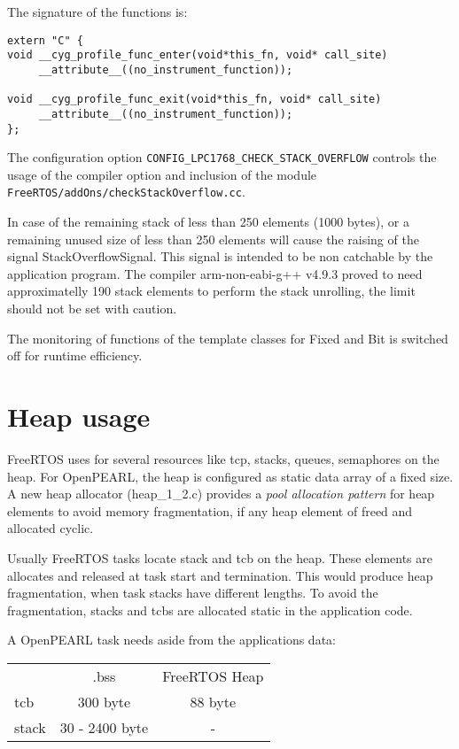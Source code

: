 The signature of the functions is:
\begin{verbatim}
extern "C" {
void __cyg_profile_func_enter(void*this_fn, void* call_site)
     __attribute__((no_instrument_function));

void __cyg_profile_func_exit(void*this_fn, void* call_site)
     __attribute__((no_instrument_function));
};
\end{verbatim}

The configuration option \texttt{CONFIG\_LPC1768\_CHECK\_STACK\_OVERFLOW}
controls the usage of the compiler option and inclusion of the
module \texttt{FreeRTOS/addOns/checkStackOverflow.cc}.


In case of the remaining stack of less than 250 elements (1000 bytes), or a
remaining unused size of less than 250 elements will cause the raising
of the signal StackOverflowSignal. This signal is intended to be non catchable
by the application program. 
The compiler arm-non-eabi-g++ v4.9.3 proved to need approximatelly 190 stack elements to perform the stack unrolling, the limit should not be set with caution.

The monitoring of functions of the template classes for Fixed and Bit 
is switched off for runtime efficiency.

\section{Heap usage}
FreeRTOS uses for several resources like tcp, stacks, queues, semaphores 
on the heap.
For OpenPEARL, the heap is configured as static data array of a fixed size.
A new heap allocator (heap\_1\_2.c) provides a {\em pool allocation pattern}
for heap elements to avoid memory fragmentation, if any heap element
of freed and allocated cyclic.

Usually FreeRTOS tasks locate stack and tcb on the heap. 
These elements are allocates and released at task start and termination.
This would produce heap fragmentation, when task stacks have different lengths.
To avoid the fragmentation, stacks and tcbs are allocated static in the
application code.

A OpenPEARL task needs aside from the applications data:

\begin{tabular}{lcc}
    & .bss & FreeRTOS Heap \\
tcb & 300 byte & 88 byte \\
stack & 30 - 2400 byte & - \\
\end{tabular} 

